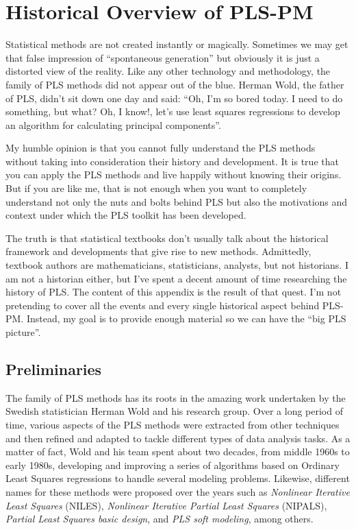 \documentclass[12pt]{book}\usepackage{graphicx, color}
\begin{document}
\appendix
\renewcommand{\thesection}{\arabic{section}}



\chapter{Historical Overview of PLS-PM}
Statistical methods are not created instantly or magically. Sometimes we may get that false impression of ``spontaneous generation'' but obviously it is just a distorted view of the reality. Like any other technology and methodology, the family of PLS methods did not appear out of the blue. Herman Wold, the father of PLS, didn't sit down one day and said: ``Oh, I'm so bored today. I need to do something, but what? Oh, I know!, let's use least squares regressions to develop an algorithm for calculating principal components''. 

My humble opinion is that you cannot fully understand the PLS methods without taking into consideration their history and development. It is true that you can apply the PLS methods and live happily without knowing their origins. But if you are like me, that is not enough when you want to completely understand not only the nuts and bolts behind PLS but also the motivations and context under which the PLS toolkit has been developed.

The truth is that statistical textbooks don't usually talk about the historical framework and developments that give rise to new methods. Admittedly, textbook authors are mathematicians, statisticians, analysts, but not historians. I am not a historian either, but I've spent a decent amount of time researching the history of PLS. The content of this appendix is the result of that quest. I'm not pretending to cover all the events and every single historical aspect behind PLS-PM. Instead, my goal is to provide enough material so we can have the ``big PLS picture''.


\section{Preliminaries}
The family of PLS methods has its roots in the amazing work undertaken by the Swedish statistician Herman Wold and his research group. Over a long period of time, various aspects of the PLS methods were extracted from other techniques and then refined and adapted to tackle different types of data analysis tasks. As a matter of fact, Wold and his team spent about two decades, from middle 1960s to early 1980s, developing and improving a series of algorithms based on Ordinary Least Squares regressions to handle several modeling problems. Likewise, different names for these methods were proposed over the  years such as \textit{Nonlinear Iterative Least Squares} (NILES), \textit{Nonlinear Iterative Partial Least Squares} (NIPALS), \textit{Partial Least Squares basic design}, and \textit{PLS soft modeling}, among others. 
\end{document}
